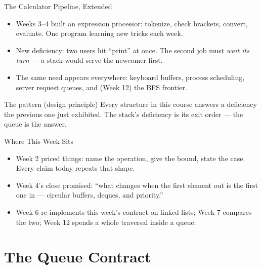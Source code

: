 \documentclass[aspectratio=169]{beamer}
\begin{document}
\begin{frame}{The Calculator Pipeline, Extended}
  \begin{itemize}
    \item Weeks 3--4 built an expression processor: tokenize, check brackets,
      convert, evaluate. One program learning new tricks each week.
    \item New deficiency: two users hit ``print'' at once. The second job
      must \emph{wait its turn} --- a stack would serve the newcomer first.
    \item The same need appears everywhere: keyboard buffers, process
      scheduling, server request queues, and (Week 12) the BFS frontier.
  \end{itemize}
  \begin{exampleblock}{The pattern (design principle)}
    Every structure in this course answers a deficiency the previous one just
    exhibited. The stack's deficiency is its exit order --- the queue is the
    answer.
  \end{exampleblock}
\end{frame}

\begin{frame}{Where This Week Sits}
  \begin{itemize}
    \item Week 2 priced things: name the operation, give the bound, state the
      case. Every claim today repeats that shape.
    \item Week 4's close promised: ``what changes when the first element out
      is the first one in --- circular buffers, deques, and priority.''
    \item Week 6 re-implements this week's contract on linked lists; Week 7
      compares the two; Week 12 spends a whole traversal inside a queue.
  \end{itemize}
\end{frame}


\section{The Queue Contract}
\end{document}
